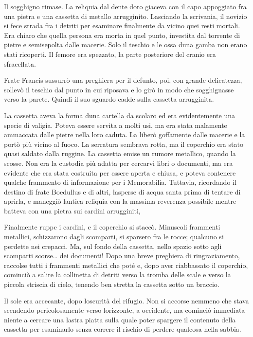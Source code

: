 Il sogghigno rimase. La reliquia dal dente d\textquotesingle oro giaceva
con il capo appoggiato fra una pietra e una cassetta di metallo
arrugginito. Lasciando la scrivania, il novizio si fece strada fra i
detriti per esaminare finalmente da vicino quei resti mortali. Era
chiaro che quella persona era morta in quel punto, investita dal
torrente di pietre e semisepolta dalle macerie. Solo il teschio e le
ossa d\textquotesingle una gamba non erano stati ricoperti. Il femore
era spezzato, la parte posteriore del cranio era sfracellata.

Frate Francis sussurrò una preghiera per il defunto, poi, con grande
delicatezza, sollevò il teschio dal punto in cui riposava e lo girò in
modo che sogghignasse verso la parete. Quindi il suo sguardo cadde sulla
cassetta arrugginita.

La cassetta aveva la forma d\textquotesingle una cartella da scolaro ed
era evidentemente una specie di valigia. Poteva essere servita a molti
usi, ma era stata malamente ammaccata dalle pietre nella loro caduta. La
liberò goffamente dalle macerie e la portò più vicino al fuoco. La
serratura sembrava rotta, ma il coperchio era stato quasi saldato dalla
ruggine. La cassetta emise un rumore metallico, quando la scosse. Non
era la custodia più adatta per cercarvi libri o documenti, ma era
evidente che era stata costruita per essere aperta e chiusa, e poteva
contenere qualche frammento di informazione per i Memorabilia. Tuttavia,
ricordando il destino di frate Boedullus e di altri,
l\textquotesingle asperse di acqua santa prima di tentare di aprirla, e
maneggiò l\textquotesingle antica reliquia con la massima reverenza
possibile mentre batteva con una pietra sui cardini arrugginiti,

Finalmente ruppe i cardini, e il coperchio si staccò. Minuscoli
frammenti metallici, schizzarono dagli scomparti, si sparsero fra le
rocce; qualcuno si perdette nei crepacci. Ma, sul fondo della cassetta,
nello spazio sotto agli scomparti scorse\ldots{} dei documenti! Dopo una
breve preghiera di ringraziamento, raccolse tutti i frammenti metallici
che poté e, dopo aver riabbassato il coperchio, cominciò a salire la
collinetta di detriti verso la tromba delle scale e verso la piccola
striscia di cielo, tenendo ben stretta la cassetta sotto un braccio.

Il sole era accecante, dopo l\textquotesingle oscurità del rifugio. Non
si accorse nemmeno che stava scendendo pericolosamente verso
l\textquotesingle orizzonte, a occidente, ma cominciò immediata-niente a
cercare una lastra piatta sulla quale poter spargere il contenuto della
cassetta per esaminarlo senza correre il rischio di perdere qualcosa
nella sabbia.

